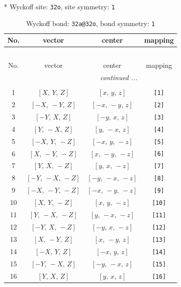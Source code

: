 \documentclass[fleqn,8pt]{jsarticle}
\begin{document}
* Wyckoff site: {\tt 32o}, site symmetry: {\tt 1}
\renewcommand{\arraystretch}{1.2}
\begin{longtable}{cccc}
\caption{Wyckoff bond: {\tt 32a@32o}, bond symmetry: {\tt 1}}
 \\
 \hline \hline
No. & vector & center & mapping \\ \hline \endfirsthead

\multicolumn{3}{l}{\tablename\ \thetable{}} \\
 \hline \hline
No. & vector & center & mapping \\ \hline \endhead

 \hline \hline
\multicolumn{3}{r}{\footnotesize\it continued ...} \\ \endfoot

 \hline \hline
\multicolumn{3}{r}{} \\ \endlastfoot

1 & $\left[ X,\, Y,\, Z \right]$ & $\left[ x,\, y,\, z \right]$ & {\tt [1]} \\ \hline
2 & $\left[ - X,\, - Y,\, Z \right]$ & $\left[ - x,\, - y,\, z \right]$ & {\tt [2]} \\ \hline
3 & $\left[ - Y,\, X,\, Z \right]$ & $\left[ - y,\, x,\, z \right]$ & {\tt [3]} \\ \hline
4 & $\left[ Y,\, - X,\, Z \right]$ & $\left[ y,\, - x,\, z \right]$ & {\tt [4]} \\ \hline
5 & $\left[ - X,\, Y,\, - Z \right]$ & $\left[ - x,\, y,\, - z \right]$ & {\tt [5]} \\ \hline
6 & $\left[ X,\, - Y,\, - Z \right]$ & $\left[ x,\, - y,\, - z \right]$ & {\tt [6]} \\ \hline
7 & $\left[ Y,\, X,\, - Z \right]$ & $\left[ y,\, x,\, - z \right]$ & {\tt [7]} \\ \hline
8 & $\left[ - Y,\, - X,\, - Z \right]$ & $\left[ - y,\, - x,\, - z \right]$ & {\tt [8]} \\ \hline
9 & $\left[ - X,\, - Y,\, - Z \right]$ & $\left[ - x,\, - y,\, - z \right]$ & {\tt [9]} \\ \hline
10 & $\left[ X,\, Y,\, - Z \right]$ & $\left[ x,\, y,\, - z \right]$ & {\tt [10]} \\ \hline
11 & $\left[ Y,\, - X,\, - Z \right]$ & $\left[ y,\, - x,\, - z \right]$ & {\tt [11]} \\ \hline
12 & $\left[ - Y,\, X,\, - Z \right]$ & $\left[ - y,\, x,\, - z \right]$ & {\tt [12]} \\ \hline
13 & $\left[ X,\, - Y,\, Z \right]$ & $\left[ x,\, - y,\, z \right]$ & {\tt [13]} \\ \hline
14 & $\left[ - X,\, Y,\, Z \right]$ & $\left[ - x,\, y,\, z \right]$ & {\tt [14]} \\ \hline
15 & $\left[ - Y,\, - X,\, Z \right]$ & $\left[ - y,\, - x,\, z \right]$ & {\tt [15]} \\ \hline
16 & $\left[ Y,\, X,\, Z \right]$ & $\left[ y,\, x,\, z \right]$ & {\tt [16]} \\
\end{longtable}
\end{document}
